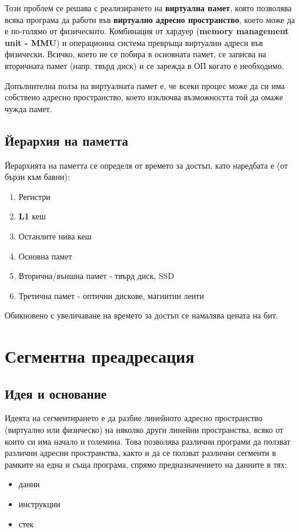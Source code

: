 \documentclass[fleqn,12pt]{article}
\begin{document}
Този проблем се решава с реализирането на \textbf{виртуална памет}, която позволява всяка програма да работи във \textbf{виртуално адресно пространство},
което може да е по-голямо от физическото. Комбинация от хардуер (\textbf{memory management unit - MMU}) и операционна система превръща 
виртуални адреси във физически. Всичко, което не се побира в основната памет, се записва на вторичната памет (напр. твърд диск) и се 
зарежда в ОП когато е необходимо.

Допълнителна полза на виртуалната памет е, че всеки процес може да си има собствено адресно пространство, което изключва възможността
той да омаже чужда памет.

\subsection{Йерархия на паметта}
Йерархията на паметта се определя от времето за достъп, като наредбата е (от бързи към бавни):
\begin{enumerate}
    \item Регистри
    \item \textbf{L1} кеш
    \item Останлите нива кеш
    \item Основна памет
    \item Вторична/външна памет - твърд диск, SSD
    \item Третична памет - оптични дискове, магнитни ленти
\end{enumerate}

Обикновено с увеличаване на времето за достъп се намалява цената на бит.

\section{Сегментна преадресация}

\subsection{Идея и основание}
Идеята на сегментирането е да разбие линейното адресно пространство (виртуално или физическо) на няколко други линейни пространства,
всяко от които си има начало и големина.
Това позволява различни програми да ползват различни адресни пространства, както и да се ползват различни сегменти в рамките на една и съща 
програма, спрямо предназначението на данните в тях:
\begin{itemize}
    \item данни
    \item инструкции
    \item стек
\end{itemize}
\end{document}
